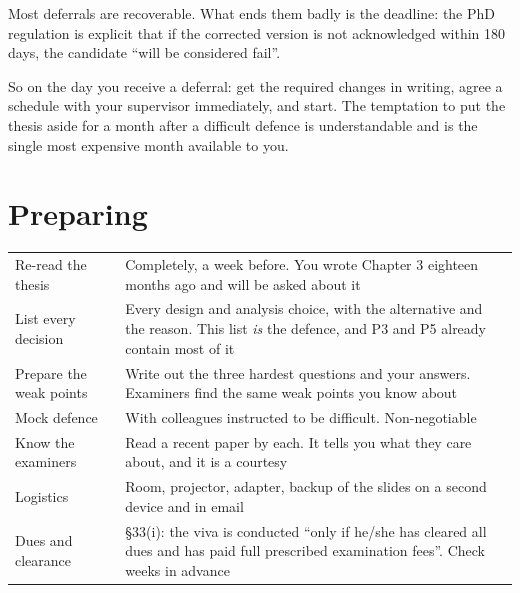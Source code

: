 \begin{conceptbox}
Most deferrals are recoverable. What ends them badly is the deadline: the PhD
regulation is explicit that if the corrected version is not acknowledged within
180 days, the candidate ``will be considered fail''.

\medskip
So on the day you receive a deferral: get the required changes in writing, agree
a schedule with your supervisor immediately, and start. The temptation to put
the thesis aside for a month after a difficult defence is understandable and is
the single most expensive month available to you.
\end{conceptbox}

\section{Preparing}

\begin{center}
\small
\begin{tabular}{@{}L{3.4cm}L{10.9cm}@{}}
\toprule
Re-read the thesis  & Completely, a week before. You wrote Chapter 3 eighteen
                      months ago and will be asked about it \\
List every decision & Every design and analysis choice, with the alternative
                      and the reason. This list \emph{is} the defence, and P3
                      and P5 already contain most of it \\
Prepare the weak points & Write out the three hardest questions and your
                      answers. Examiners find the same weak points you know
                      about \\
Mock defence        & With colleagues instructed to be difficult. Non-negotiable \\
Know the examiners  & Read a recent paper by each. It tells you what they care
                      about, and it is a courtesy \\
Logistics           & Room, projector, adapter, backup of the slides on a
                      second device and in email \\
Dues and clearance  & \S33(i): the viva is conducted ``only if he/she has
                      cleared all dues and has paid full prescribed examination
                      fees''. Check weeks in advance \\
\bottomrule
\end{tabular}
\end{center}

